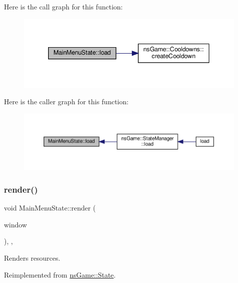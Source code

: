 Here is the call graph for this function\+:\nopagebreak
\begin{figure}[H]
\begin{center}
\leavevmode
\includegraphics[width=339pt]{class_main_menu_state_a723f41a3c34138c5c5f7dcafc076718e_cgraph}
\end{center}
\end{figure}
Here is the caller graph for this function\+:\nopagebreak
\begin{figure}[H]
\begin{center}
\leavevmode
\includegraphics[width=350pt]{class_main_menu_state_a723f41a3c34138c5c5f7dcafc076718e_icgraph}
\end{center}
\end{figure}
\mbox{\label{class_main_menu_state_a1f11855f3b961e7a71c7c4e16f0b3478}} 
\subsubsection{\texorpdfstring{render()}{render()}}
{\footnotesize\ttfamily void Main\+Menu\+State\+::render (\begin{DoxyParamCaption}\item[{Min\+GL \&}]{window }\end{DoxyParamCaption})\hspace{0.3cm}{\ttfamily [inline]}, {\ttfamily [override]}, {\ttfamily [virtual]}}



Renders resources. 



Reimplemented from \hyperlink{structns_game_1_1_state_a214f8ee52de4b318f1ed3861a578ce67}{ns\+Game\+::\+State}.



